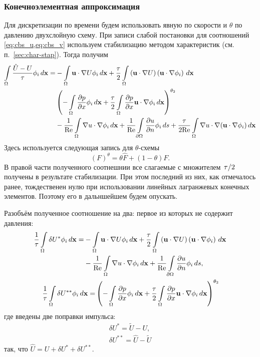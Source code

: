 \subsubsection{Конечноэлементная аппроксимация}
Для дискретизации по времени будем использовать явную по скорости и $\theta$ по давлению двухслойную схему.
При записи слабой постановки для соотношений \cref{eq:cbs_u,eq:cbs_v}
используем стабилизацию методом характеристик (см. п.~\ref{sec:char-stap}).
Тогда получим
\begin{equation}
\nonumber
\begin{split}
\int\limits_{\Omega}\frac{\hat U - U}{\tau}\phi_i \, d \boldsymbol{\rm x} =
&- \int\limits_{\Omega}\boldsymbol{\rm u} \cdot \nabla U \phi_i \, d \boldsymbol{\rm x}
 +\frac{\tau}{2}\int\limits_{\Omega}\left(\boldsymbol{\rm u} \cdot \nabla U \right)\left(\boldsymbol{\rm u} \cdot \nabla \phi_i\right) \, d \boldsymbol{\rm x}
\\
&
 \left(
 -\int\limits_{\Omega}\frac{\partial p}{\partial x}\phi_i \, d \boldsymbol{\rm x}
 +\frac{\tau}{2}\int\limits_{\Omega}\frac{\partial p}{\partial x}\boldsymbol{\rm u} \cdot \nabla\phi_i \, d \boldsymbol{\rm x}
 \right)^{\theta_2}
\\
&
 -\frac{1}{\mathrm{Re}}\int\limits_{\Omega}\nabla u \cdot \nabla \phi_i \, d \boldsymbol{\rm x}
 +\frac{1}{\mathrm{Re}}\int\limits_{\partial\Omega}\frac{\partial u}{\partial n}\phi_i \, d s
 +\frac{\tau}{2\mathrm{Re}}\int\limits_{\Omega}\nabla u \cdot \nabla (\boldsymbol{\rm u} \cdot \nabla \phi_i) \, d \boldsymbol{\rm x}
\end{split}
\end{equation}
Здесь используется следующая запись для $\theta$-схемы
$$
\left( F\right)^{\theta} = \theta \hat F + (1 - \theta) F.
$$
В правой части полученного соотнешнии все слагаемые с
множителем $\left.\tau\middle/2\right.$ получены в результате стабилизации.
При этом последний из них, как отмечалось ранее,
тождественен нулю при использовании линейных лагранжевых
конечных элементов. Поэтому его в дальншейшем будем опускать.

Разобъём полученное соотношение на два: первое из которых не содержит давления:
\begin{align}
\label{eq:cbs_split1}
\begin{split}
\frac{1}{\tau}\int\limits_{\Omega}\delta U^*\phi_i \, d \boldsymbol{\rm x} =
&- \int\limits_{\Omega}\boldsymbol{\rm u} \cdot \nabla U \phi_i \, d \boldsymbol{\rm x}
 +\frac{\tau}{2}\int\limits_{\Omega}\left(\boldsymbol{\rm u} \cdot \nabla U \right)\left(\boldsymbol{\rm u} \cdot \nabla \phi_i\right) \, d \boldsymbol{\rm x}
\\
&
 -\frac{1}{\mathrm{Re}}\int\limits_{\Omega}\nabla u \cdot \nabla \phi_i \, d \boldsymbol{\rm x}
 +\frac{1}{\mathrm{Re}}\int\limits_{\partial\Omega}\frac{\partial u}{\partial n}\phi_i \, d s,
\end{split}\\
\label{eq:cbs_split2}
\begin{split}
\frac1\tau\int\limits_{\Omega}\delta U^{**}\phi_i \, d \boldsymbol{\rm x} =
&
 \left(
 -\int\limits_{\Omega}\frac{\partial p}{\partial x}\phi_i \, d \boldsymbol{\rm x}
 +\frac{\tau}{2}\int\limits_{\Omega}\frac{\partial p}{\partial x}\boldsymbol{\rm u} \cdot \nabla\phi_i \, d \boldsymbol{\rm x}
 \right)^{\theta_2}
\end{split}
\end{align}
где введены две поправки импульса:
\begin{align*}
\delta U^* = \tilde U - U, \\
\delta U^{**} = \hat U - \tilde U
\end{align*}
так, что $\hat U = U + \delta U^* + \delta U^{**}$.

